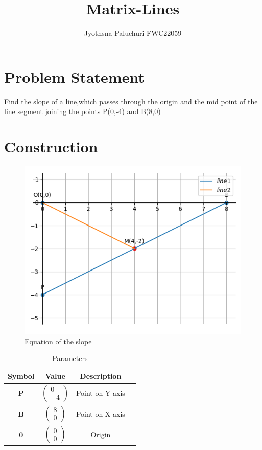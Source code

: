 \documentclass[journal,12pt,twocolumn]{IEEEtran}
\title{
Matrix-Lines
}
\author{Jyothsna Paluchuri-FWC22059\\}
\newcommand{\myvec}[1]{\ensuremath{\begin{pmatrix}#1\end{pmatrix}}}
\let\vec\mathbf
\begin{document}
\maketitle
\tableofcontents
\bigskip
\section{Problem Statement}
Find the slope of a line,which passes through the origin and the mid point of the line segment joining the points P(0,-4) and B(8,0)\\
\section{Construction}
\begin{figure}[h]
    \centering
\includegraphics[width=\columnwidth]{line.png}
    \caption{Equation of the slope}
    \label{fig:my_label}
\end{figure}
\vspace{2cm}
\begin{table}[h]
    \centering
    \begin{tabular}{|c|c|c|c|}
       \hline
       \textbf{Symbol}&\textbf{Value}&\textbf{Description}  \\
       \hline
	    $\vec{P}$ & $\myvec{
		    0\\
		    -4}$
	    & Point on Y-axis\\
        \hline
	    $\vec{B}$ & $\myvec{8\\0}$
 & Point on X-axis\\
        \hline
	    $\vec{0}$ & $\myvec{0\\0}$
 & Origin\\
        \hline
    \end{tabular}
    \caption{Parameters}
    \label{tab:my_label}
\end{table}
\end{document}
